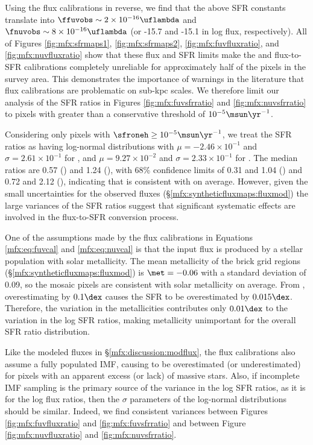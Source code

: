 Using the flux calibrations in reverse, we find that the above SFR constants
translate into $\ffuvobs \sim 2\times 10^{-16}\uflambda$ and $\fnuvobs \sim
8\times 10^{-16}\uflambda$ (or -15.7 and -15.1 in log flux, respectively). All
of Figures  \ref{fig:mfx:sfrmaps1}, \ref{fig:mfx:sfrmaps2},
\ref{fig:mfx:fuvfluxratio}, and \ref{fig:mfx:nuvfluxratio} show that these flux
and SFR limits make the \fuv{} and \nuv{} flux-to-SFR calibrations completely
unreliable for approximately half of the pixels in the survey area. This
demonstrates the importance of warnings in the literature
\citep[e.g.,][]{Murphy:2011,Kennicutt:2012,Leroy:2012} that flux calibrations
are problematic on sub-kpc scales. We therefore limit our analysis of the SFR
ratios in Figures \ref{fig:mfx:fuvsfrratio} and \ref{fig:mfx:nuvsfrratio} to
pixels with \sfroneh{} greater than a conservative threshold of
$10^{-5}\msun\yr^{-1}$.

Considering only pixels with $\sfroneh \ge 10^{-5}\msun\yr^{-1}$, we treat the
SFR ratios as having log-normal distributions with $\mu = -2.46\times 10^{-1}$
and $\sigma = 2.61\times 10^{-1}$ for \fuv{}, and $\mu = 9.27\times 10^{-2}$
and $\sigma = 2.33\times 10^{-1}$ for \nuv{}. The median ratios are 0.57
(\fuv{}) and 1.24 (\nuv{}), with 68\% confidence limits of 0.31 and 1.04
(\fuv{}) and 0.72 and 2.12 (\nuv{}), indicating that \sfrx{} is consistent with
\sfroneh{} on average. However, given the small uncertainties for the observed
fluxes (\S \ref{mfx:syntheticfluxmaps:fluxmod}) the large variances of the SFR
ratios suggest that significant systematic effects are involved in the
flux-to-SFR conversion process.

One of the assumptions made by the flux calibrations in Equations
\ref{mfx:eq:fuvcal} and \ref{mfx:eq:nuvcal} is that the input flux is produced
by a stellar population with solar metallicity. The mean metallicity of the
brick grid regions (\S \ref{mfx:syntheticfluxmaps:fluxmod}) is $\met = -0.06$
with a standard deviation of 0.09, so the mosaic pixels are consistent with
solar metallicity on average. From \citet{Simones:2014}, overestimating \met{}
by $0.1\dex$ causes the SFR to be overestimated by $0.015\dex$. Therefore, the
variation in the metallicities contributes only $0.01\dex$ to the variation in
the log SFR ratios, making metallicity unimportant for the overall SFR ratio
distribution.

Like the modeled fluxes in \S \ref{mfx:discussion:modflux}, the flux
calibrations also assume a fully populated IMF, causing \sfrx{} to be
overestimated (or underestimated) for pixels with an apparent excess (or lack)
of massive stars. Also, if incomplete IMF sampling is the primary source of the
variance in the log SFR ratios, as it is for the log flux ratios, then the
$\sigma$ parameters of the log-normal distributions should be similar. Indeed,
we find consistent variances between Figures \ref{fig:mfx:fuvfluxratio} and
\ref{fig:mfx:fuvsfrratio} and between Figure \ref{fig:mfx:nuvfluxratio} and
\ref{fig:mfx:nuvsfrratio}.

